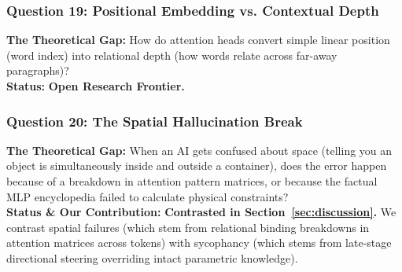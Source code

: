\documentclass[journal,10pt,twocolumn]{IEEEtran}
\begin{document}
\subsubsection{Question 19: Positional Embedding vs. Contextual Depth}
\textbf{The Theoretical Gap:} How do attention heads convert simple linear position (word index) into relational depth (how words relate across far-away paragraphs)? \\
\textbf{Status:} \textbf{Open Research Frontier.}

\subsubsection{Question 20: The Spatial Hallucination Break}
\textbf{The Theoretical Gap:} When an AI gets confused about space (telling you an object is simultaneously inside and outside a container), does the error happen because of a breakdown in attention pattern matrices, or because the factual MLP encyclopedia failed to calculate physical constraints? \\
\textbf{Status \& Our Contribution:} \textbf{Contrasted in Section~\ref{sec:discussion}.} We contrast spatial failures (which stem from relational binding breakdowns in attention matrices across tokens) with sycophancy (which stems from late-stage directional steering overriding intact parametric knowledge).
\end{document}
